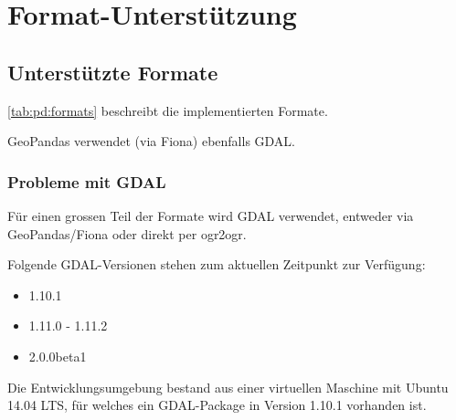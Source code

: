 \section{Format-Unterstützung}
\subsection{Unterstützte Formate}
\cref{tab:pd:formats} beschreibt die implementierten Formate.


GeoPandas verwendet (via Fiona) ebenfalls GDAL.

\subsubsection{Probleme mit GDAL}\label{sec:pd:format-gdal-problems}
Für einen grossen Teil der Formate wird GDAL verwendet, entweder via GeoPandas/Fiona oder direkt per ogr2ogr. 

Folgende GDAL-Versionen stehen zum aktuellen Zeitpunkt zur Verfügung:
\begin{itemize}
\item 1.10.1
\item 1.11.0 - 1.11.2
\item 2.0.0beta1
\end{itemize}

Die Entwicklungsumgebung bestand aus einer virtuellen Maschine mit Ubuntu 14.04 LTS, für welches ein GDAL-Package in Version 1.10.1 vorhanden ist. 

